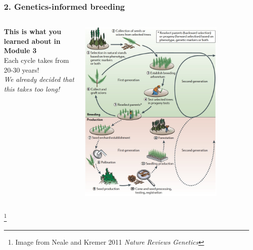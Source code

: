 \documentclass[xcolor=dvipsnames]{beamer}
\newcommand\blfootnote[1]{%
	\begingroup
	\renewcommand\thefootnote{}\footnote{#1}%
	\addtocounter{footnote}{-1}%
	\endgroup
}
\begin{document}
\begin{frame}
\frametitle{2. Genetics-informed breeding}
	\begin{columns}
		\begin{column}{0.4\textwidth}
	\textbf{This is what you learned about in Module 3}\\
	
	Each cycle takes from 20-30 years!\\
	
	\vspace{30pt}
	\textit{We already decided that this takes too long!}
	
	
\end{column}
		\begin{column}{0.65\textwidth}
			\centering 	\includegraphics[keepaspectratio, width  = 0.8\textwidth]{img/treeImprovement}
		\end{column}

	\end{columns}
	\blfootnote{Image from Neale and Kremer 2011 \textit{Nature Reviews Genetics}}
\end{frame}
\end{document}
